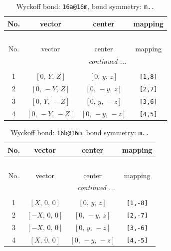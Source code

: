 \documentclass[fleqn,8pt]{jsarticle}
\begin{document}
\begin{longtable}{cccc}
\caption{Wyckoff bond: {\tt 16a@16m}, bond symmetry: {\tt m..}}
 \\
 \hline \hline
No. & vector & center & mapping \\ \hline \endfirsthead

\multicolumn{3}{l}{\tablename\ \thetable{}} \\
 \hline \hline
No. & vector & center & mapping \\ \hline \endhead

 \hline \hline
\multicolumn{3}{r}{\footnotesize\it continued ...} \\ \endfoot

 \hline \hline
\multicolumn{3}{r}{} \\ \endlastfoot

1 & $\left[ 0,\, Y,\, Z \right]$ & $\left[ 0,\, y,\, z \right]$ & {\tt [1,8]} \\ \hline
2 & $\left[ 0,\, - Y,\, Z \right]$ & $\left[ 0,\, - y,\, z \right]$ & {\tt [2,7]} \\ \hline
3 & $\left[ 0,\, Y,\, - Z \right]$ & $\left[ 0,\, y,\, - z \right]$ & {\tt [3,6]} \\ \hline
4 & $\left[ 0,\, - Y,\, - Z \right]$ & $\left[ 0,\, - y,\, - z \right]$ & {\tt [4,5]} \\
\end{longtable}
\renewcommand{\arraystretch}{1.2}
\begin{longtable}{cccc}
\caption{Wyckoff bond: {\tt 16b@16m}, bond symmetry: {\tt m..}}
 \\
 \hline \hline
No. & vector & center & mapping \\ \hline \endfirsthead

\multicolumn{3}{l}{\tablename\ \thetable{}} \\
 \hline \hline
No. & vector & center & mapping \\ \hline \endhead

 \hline \hline
\multicolumn{3}{r}{\footnotesize\it continued ...} \\ \endfoot

 \hline \hline
\multicolumn{3}{r}{} \\ \endlastfoot

1 & $\left[ X,\, 0,\, 0 \right]$ & $\left[ 0,\, y,\, z \right]$ & {\tt [1,-8]} \\ \hline
2 & $\left[ - X,\, 0,\, 0 \right]$ & $\left[ 0,\, - y,\, z \right]$ & {\tt [2,-7]} \\ \hline
3 & $\left[ - X,\, 0,\, 0 \right]$ & $\left[ 0,\, y,\, - z \right]$ & {\tt [3,-6]} \\ \hline
4 & $\left[ X,\, 0,\, 0 \right]$ & $\left[ 0,\, - y,\, - z \right]$ & {\tt [4,-5]} \\
\end{longtable}
\end{document}
